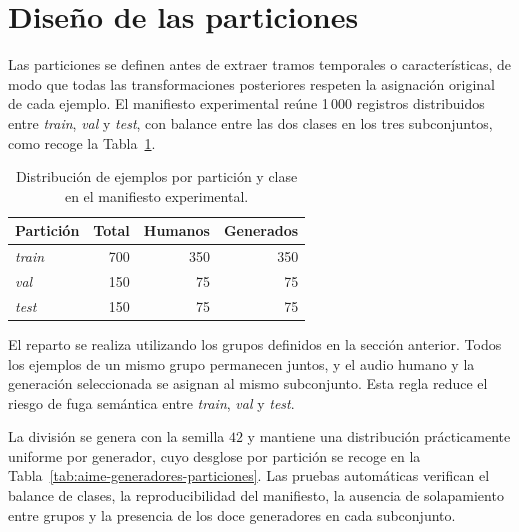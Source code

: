 \section{Diseño de las particiones}

Las particiones se definen antes de extraer tramos temporales o características, de modo que todas las transformaciones posteriores respeten la asignación original de cada ejemplo. El manifiesto experimental reúne 1\,000 registros distribuidos entre \textit{train}, \textit{val} y \textit{test}, con balance entre las dos clases en los tres subconjuntos, como recoge la Tabla~\ref{tab:aime-particiones}.

\begin{table}[H]
    \centering
    \begin{tabular}{lrrr}
        \hline
        \textbf{Partición} & \textbf{Total} & \textbf{Humanos} & \textbf{Generados} \\
        \hline
        \textit{train} & 700 & 350 & 350 \\
        \textit{val} & 150 & 75 & 75 \\
        \textit{test} & 150 & 75 & 75 \\
        \hline
    \end{tabular}
    \caption{Distribución de ejemplos por partición y clase en el manifiesto experimental.}
    \label{tab:aime-particiones}
\end{table}

El reparto se realiza utilizando los grupos definidos en la sección anterior. Todos los ejemplos de un mismo grupo permanecen juntos, y el audio humano y la generación seleccionada se asignan al mismo subconjunto. Esta regla reduce el riesgo de fuga semántica entre \textit{train}, \textit{val} y \textit{test}.

La división se genera con la semilla $42$ y mantiene una distribución prácticamente uniforme por generador, cuyo desglose por partición se recoge en la Tabla~\ref{tab:aime-generadores-particiones}. Las pruebas automáticas verifican el balance de clases, la reproducibilidad del manifiesto, la ausencia de solapamiento entre grupos y la presencia de los doce generadores en cada subconjunto.

